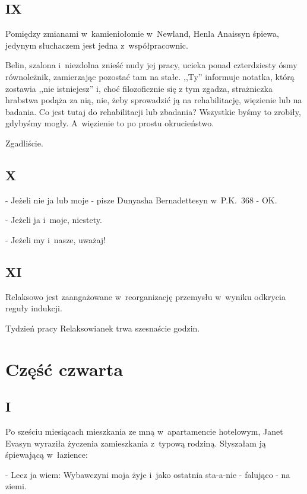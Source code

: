 \documentclass[oneside,polish,12pt,sfheadings]{mwbk}
\begin{document}
\chapter{IX}

Pomiędzy zmianami w~kamieniołomie w~Newland, Henla Anaissyn śpiewa,
jedynym słuchaczem jest jedna z~współpracownic.

Belin, szalona i~niezdolna znieść nudy jej pracy, ucieka ponad czterdziesty
ósmy równoleżnik, zamierzając pozostać tam na stałe. ,,Ty'' informuje notatka, którą zostawia ,,nie istniejesz'' i, choć filozoficznie się
z tym zgadza, strażniczka hrabstwa podąża za nią, nie, żeby sprowadzić
ją na rehabilitację, więzienie lub na badania. Co jest tutaj do rehabilitacji
lub zbadania? Wszystkie byśmy to zrobiły, gdybyśmy mogły. A~więzienie
to po prostu okrucieństwo.

Zgadliście.

\chapter{X}

- Jeżeli nie ja lub moje - pisze Dunyasha Bernadettesyn w~P.K.~368 - OK.

- Jeżeli ja i~moje, niestety.

- Jeżeli my i~nasze, uważaj! 

\chapter{XI}

Relaksowo jest zaangażowane w~reorganizację przemysłu w~wyniku odkrycia
reguły indukcji.

Tydzień pracy Relaksowianek trwa szesnaście godzin.

\part*{Część czwarta}

\chapter{I}

Po sześciu miesiącach mieszkania ze mną w~apartamencie hotelowym,
Janet Evasyn wyraziła życzenia zamieszkania z~typową rodziną. Słyszałam
ją śpiewającą w~łazience: 

- Lecz ja wiem: Wybawczyni moja żyje i~jako ostatnia sta-a-nie - falująco - na ziemi.
\end{document}
